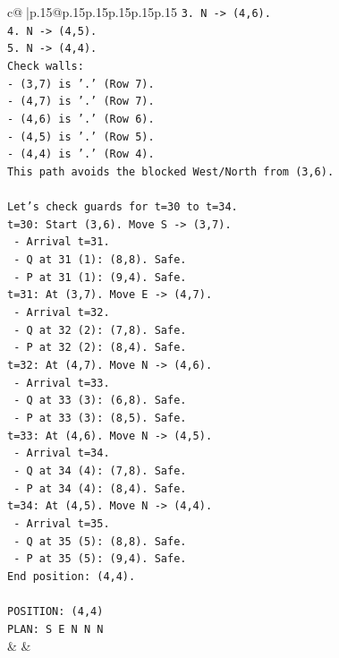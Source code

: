 \documentclass{article}
\begin{document}
{\begin{supertabular}{c@{$\;$}|p{.15\linewidth}@{}p{.15\linewidth}p{.15\linewidth}p{.15\linewidth}p{.15\linewidth}p{.15\linewidth}}
{{{\texttt{3. N {-}> (4,6).} \\
\texttt{4. N {-}> (4,5).} \\
\texttt{5. N {-}> (4,4).} \\
\texttt{Check walls:} \\
\texttt{{-} (3,7) is '.' (Row 7).} \\
\texttt{{-} (4,7) is '.' (Row 7).} \\
\texttt{{-} (4,6) is '.' (Row 6).} \\
\texttt{{-} (4,5) is '.' (Row 5).} \\
\texttt{{-} (4,4) is '.' (Row 4).} \\
\texttt{This path avoids the blocked West/North from (3,6).} \\
\\ 
\texttt{Let's check guards for t=30 to t=34.} \\
\texttt{t=30: Start (3,6). Move S {-}> (3,7).} \\
\texttt{  {-} Arrival t=31.} \\
\texttt{  {-} Q at 31 (1): (8,8). Safe.} \\
\texttt{  {-} P at 31 (1): (9,4). Safe.} \\
\texttt{t=31: At (3,7). Move E {-}> (4,7).} \\
\texttt{  {-} Arrival t=32.} \\
\texttt{  {-} Q at 32 (2): (7,8). Safe.} \\
\texttt{  {-} P at 32 (2): (8,4). Safe.} \\
\texttt{t=32: At (4,7). Move N {-}> (4,6).} \\
\texttt{  {-} Arrival t=33.} \\
\texttt{  {-} Q at 33 (3): (6,8). Safe.} \\
\texttt{  {-} P at 33 (3): (8,5). Safe.} \\
\texttt{t=33: At (4,6). Move N {-}> (4,5).} \\
\texttt{  {-} Arrival t=34.} \\
\texttt{  {-} Q at 34 (4): (7,8). Safe.} \\
\texttt{  {-} P at 34 (4): (8,4). Safe.} \\
\texttt{t=34: At (4,5). Move N {-}> (4,4).} \\
\texttt{  {-} Arrival t=35.} \\
\texttt{  {-} Q at 35 (5): (8,8). Safe.} \\
\texttt{  {-} P at 35 (5): (9,4). Safe.} \\
\texttt{End position: (4,4).} \\
\\ 
\texttt{POSITION: (4,4)} \\
\texttt{PLAN: S E N N N} \\
            }
        }
    }
    & & \\ \\


\end{supertabular}}
\end{document}
